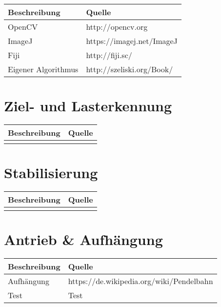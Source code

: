 \documentclass[a4paper]{report}
\begin{document}
\vspace{1em}
\noindent
\begin{tabular}{|l|l|}
	\hline 
	\textbf{Beschreibung} & \textbf{Quelle} \\
	\hline
	OpenCV & http://opencv.org \\
	\hline
	ImageJ & https://imagej.net/ImageJ \\
	\hline
	Fiji & http://fiji.sc/ \\
	\hline
	Eigener Algorithmus & http://szeliski.org/Book/ \\
	\hline
\end{tabular}

\section{Ziel- und Lasterkennung}

\vspace{1em}
\noindent
\begin{tabular}{|l|l|}
	\hline 
	\textbf{Beschreibung} & \textbf{Quelle} \\
	\hline
	&  \\
	\hline
\end{tabular}

\section{Stabilisierung}

\vspace{1em}
\noindent
\begin{tabular}{|l|l|}
	\hline 
	\textbf{Beschreibung} & \textbf{Quelle} \\
	\hline
	 &  \\
	\hline
\end{tabular}

\section{Antrieb \& Aufhängung}

\vspace{1em}
\noindent
\begin{tabular}{|l|l|}
	\hline 
	\textbf{Beschreibung} & \textbf{Quelle} \\
	\hline
	Aufhängung & https://de.wikipedia.org/wiki/Pendelbahn  \\
	\hline
	Test & Test \\
	\hline
\end{tabular}
\end{document}
